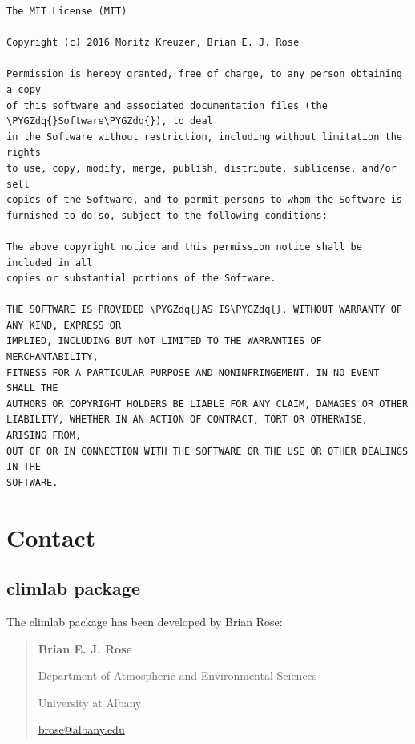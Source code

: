 \documentclass[a4paper,10pt,english]{sphinxmanual}
\def\PYGZdq{\char`\"}
\begin{document}
\begin{Verbatim}[commandchars=\\\{\}]
The MIT License (MIT)

Copyright (c) 2016 Moritz Kreuzer, Brian E. J. Rose

Permission is hereby granted, free of charge, to any person obtaining a copy
of this software and associated documentation files (the \PYGZdq{}Software\PYGZdq{}), to deal
in the Software without restriction, including without limitation the rights
to use, copy, modify, merge, publish, distribute, sublicense, and/or sell
copies of the Software, and to permit persons to whom the Software is
furnished to do so, subject to the following conditions:

The above copyright notice and this permission notice shall be included in all
copies or substantial portions of the Software.

THE SOFTWARE IS PROVIDED \PYGZdq{}AS IS\PYGZdq{}, WITHOUT WARRANTY OF ANY KIND, EXPRESS OR
IMPLIED, INCLUDING BUT NOT LIMITED TO THE WARRANTIES OF MERCHANTABILITY,
FITNESS FOR A PARTICULAR PURPOSE AND NONINFRINGEMENT. IN NO EVENT SHALL THE
AUTHORS OR COPYRIGHT HOLDERS BE LIABLE FOR ANY CLAIM, DAMAGES OR OTHER
LIABILITY, WHETHER IN AN ACTION OF CONTRACT, TORT OR OTHERWISE, ARISING FROM,
OUT OF OR IN CONNECTION WITH THE SOFTWARE OR THE USE OR OTHER DEALINGS IN THE
SOFTWARE.
\end{Verbatim}


\chapter{Contact}
\label{contact:contact}\label{contact::doc}

\section{climlab package}
\label{contact:climlab-package}
The climlab package has been developed by Brian Rose:
\begin{quote}

\begin{DUlineblock}{0em}
\item[] \textbf{Brian E. J. Rose}
\item[] Department of Atmospheric and Environmental Sciences
\item[] University at Albany
\item[] \href{mailto:brose@albany.edu}{brose@albany.edu}
\end{DUlineblock}
\end{quote}
\end{document}
